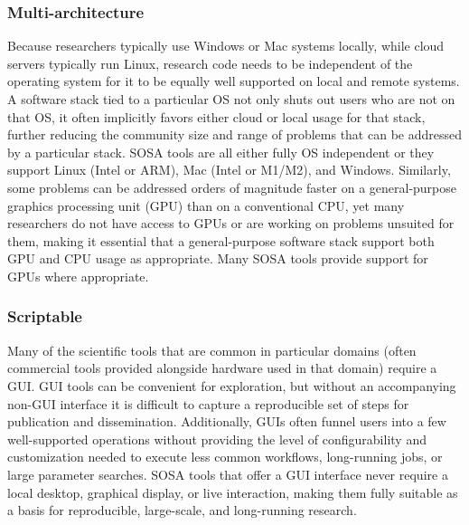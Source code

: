 \subsubsection{Multi-architecture}
Because researchers typically use Windows or Mac systems locally, while cloud servers typically run Linux, research code needs to be independent of the operating system for it to be equally well supported on local and remote systems. A software stack tied to a particular OS not only shuts out users who are not on that OS, it often implicitly favors either cloud or local usage for that stack, further reducing the community size and range of problems that can be addressed by a particular stack. SOSA tools are all either fully OS independent or they support Linux (Intel or ARM), Mac (Intel or M1/M2), and Windows. Similarly, some problems can be addressed orders of magnitude faster on a general-purpose graphics processing unit (GPU) than on a conventional CPU, yet many researchers do not have access to GPUs or are working on problems unsuited for them, making it essential that a general-purpose software stack support both GPU and CPU usage as appropriate. Many SOSA tools provide support for GPUs where appropriate.

\subsubsection{Scriptable}
Many of the scientific tools that are common in particular domains (often commercial tools provided alongside hardware used in that domain) require a GUI. GUI tools can be convenient for exploration, but without an accompanying non-GUI interface it is difficult to capture a reproducible set of steps for publication and dissemination. Additionally, GUIs often funnel users into a few well-supported operations without providing the level of configurability and customization needed to execute less common workflows, long-running jobs, or large parameter searches. SOSA tools that offer a GUI interface never require a local desktop, graphical display, or live interaction, making them fully suitable as a basis for reproducible, large-scale, and long-running research.

